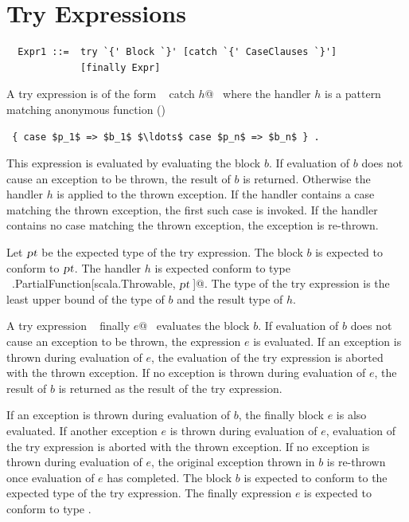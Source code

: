 \section{Try Expressions}\label{sec:try}

\syntax\begin{lstlisting}
  Expr1 ::=  try `{' Block `}' [catch `{' CaseClauses `}'] 
             [finally Expr]
\end{lstlisting}

A try expression is of the form ~ catch $h$@~
where the handler $h$ is a pattern matching anonymous function 
()
\begin{lstlisting}
 { case $p_1$ => $b_1$ $\ldots$ case $p_n$ => $b_n$ } .
\end{lstlisting}
This expression is evaluated by evaluating the block
$b$.  If evaluation of $b$ does not cause an exception to be
thrown, the result of $b$ is returned. Otherwise the 
handler $h$ is applied to the thrown exception.  
If the handler contains a case matching the thrown exception,
the first such case is invoked. If the handler contains
no case matching the thrown exception, the exception is 
re-thrown. 

Let $\mbox{\sl pt}$ be the expected type of the try expression.  The block
$b$ is expected to conform to $\mbox{\sl pt}$.  The handler $h$
is expected conform to type
~\lstinline@scala.PartialFunction[scala.Throwable, $\mbox{\sl pt}\,$]@.  The
type of the try expression is the least upper bound of the type of $b$
and the result type of $h$.

A try expression ~ finally $e$@~ evaluates the block
$b$.  If evaluation of $b$ does not cause an exception to be
thrown, the expression $e$ is evaluated. If an exception is thrown
during evaluation of $e$, the evaluation of the try expression is
aborted with the thrown exception. If no exception is thrown during
evaluation of $e$, the result of $b$ is returned as the
result of the try expression. 

If an exception is thrown during
evaluation of $b$, the finally block
$e$ is also evaluated. If another exception $e$ is thrown
during evaluation of $e$, evaluation of the try expression is
aborted with the thrown exception. If no exception is thrown during
evaluation of $e$, the original exception thrown in $b$ is
re-thrown once evaluation of $e$ has completed.  The block
$b$ is expected to conform to the expected type of the try
expression. The finally expression $e$ is expected to conform to
type .

